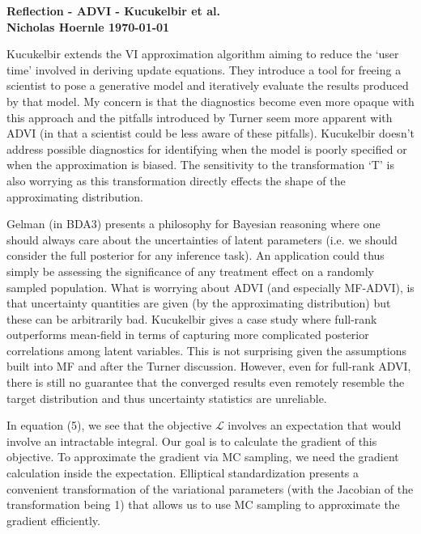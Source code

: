 \documentclass[twoside]{article}
\begin{document}
\textbf{Reflection - ADVI - Kucukelbir et al.}\\
\textbf{Nicholas Hoernle \hfill \today}

Kucukelbir extends the VI approximation algorithm aiming to reduce the `user time' involved in deriving update equations. They introduce a tool for freeing a scientist to pose a generative model and iteratively evaluate the results produced by that model. My concern is that the diagnostics become even more opaque with this approach and the pitfalls introduced by Turner seem more apparent with ADVI (in that a scientist could be less aware of these pitfalls). Kucukelbir doesn't address possible diagnostics for identifying when the model is poorly specified or when the approximation is biased. The sensitivity to the transformation `T' is also worrying as this transformation directly effects the shape of the approximating distribution.

Gelman (in BDA3) presents a philosophy for Bayesian reasoning where one should always care about the uncertainties of latent parameters (i.e. we should consider the full posterior for any inference task). An application could thus simply be assessing the significance of any treatment effect on a randomly sampled population. What is worrying about ADVI (and especially MF-ADVI), is that uncertainty quantities are given (by the approximating distribution) but these can be arbitrarily bad. Kucukelbir gives a case study where full-rank outperforms mean-field in terms of capturing more complicated posterior correlations among latent variables. This is not surprising given the assumptions built into MF and after the Turner discussion. However, even for full-rank ADVI, there is still no guarantee that the converged results even remotely resemble the target distribution and thus uncertainty statistics are unreliable.

In equation (5), we see that the objective $\mathcal{L}$ involves an expectation that would involve an intractable integral. Our goal is to calculate the gradient of this objective. To approximate the gradient via MC sampling, we need the gradient calculation inside the expectation. Elliptical standardization presents a convenient transformation of the variational parameters (with the Jacobian of the transformation being 1) that allows us to use MC sampling to approximate the gradient efficiently.
\end{document}
